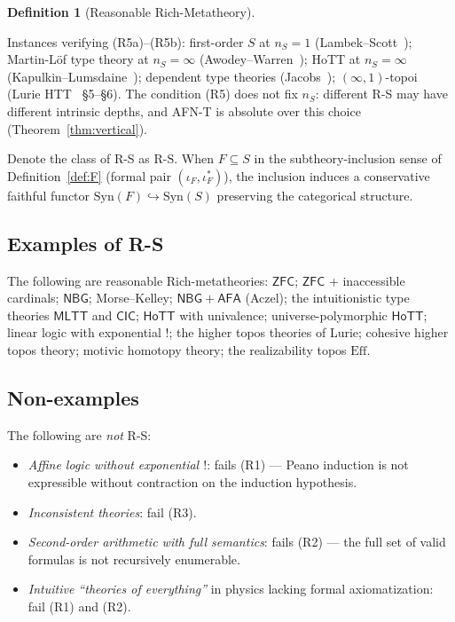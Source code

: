 \documentclass[11pt]{article}
\theoremstyle{plain}
\theoremstyle{definition}
\newtheorem{definition}[theorem]{Definition}
\newcommand{\Syn}{\mathrm{Syn}}
\newcommand{\ZFC}{\mathsf{ZFC}}
\newcommand{\MLTT}{\mathsf{MLTT}}
\newcommand{\HoTT}{\mathsf{HoTT}}
\newcommand{\CIC}{\mathsf{CIC}}
\newcommand{\NBG}{\mathsf{NBG}}
\newcommand{\AFA}{\mathsf{AFA}}
\begin{document}
\begin{definition}[Reasonable Rich-Metatheory]
\begin{itemize}
\begin{itemize}
\end{itemize}
Instances verifying (R5a)--(R5b): first-order $S$ at $n_S = 1$ (Lambek--Scott~\cite{Lawvere1964}); Martin-L\"of type theory at $n_S = \infty$ (Awodey--Warren~\cite{AwodeyWarren2009}); HoTT at $n_S = \infty$ (Kapulkin--Lumsdaine~\cite{KapulkinLumsdaine2021}); dependent type theories (Jacobs~\cite{Jacobs1999}); $(\infty, 1)$-topoi (Lurie HTT~\cite{LurieHTT} \S 5--\S 6). The condition (R5) does not fix $n_S$: different R-S may have different intrinsic depths, and AFN-T is absolute over this choice (Theorem~\ref{thm:vertical}).
\end{itemize}
Denote the class of R-S as $\mathrm{R\text{-}S}$. When $F \subseteq S$ in the subtheory-inclusion sense of Definition~\ref{def:F} (formal pair $(\iota_F, \iota_F^*)$), the inclusion induces a conservative faithful functor $\Syn(F) \hookrightarrow \Syn(S)$ preserving the categorical structure.
\end{definition}

\subsection{Examples of R-S}

The following are reasonable Rich-metatheories: $\ZFC$; $\ZFC$ + inaccessible cardinals; $\NBG$; Morse--Kelley; $\NBG + \AFA$ (Aczel); the intuitionistic type theories $\MLTT$ and $\CIC$; $\HoTT$ with univalence; universe-polymorphic $\HoTT$; linear logic with exponential $!$; the higher topos theories of Lurie; cohesive higher topos theory; motivic homotopy theory; the realizability topos $\mathrm{Eff}$.

\subsection{Non-examples}

The following are \emph{not} R-S:
\begin{itemize}
\item \emph{Affine logic without exponential $!$}: fails (R1) --- Peano induction is not expressible without contraction on the induction hypothesis.
\item \emph{Inconsistent theories}: fail (R3).
\item \emph{Second-order arithmetic with full semantics}: fails (R2) --- the full set of valid formulas is not recursively enumerable.
\item \emph{Intuitive ``theories of everything''} in physics lacking formal axiomatization: fail (R1) and (R2).
\end{itemize}
\end{document}
